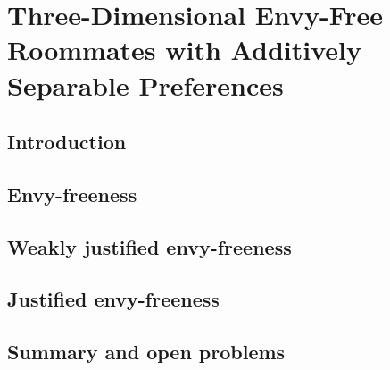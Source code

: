 \chapter{Three-Dimensional Envy-Free Roommates with Additively Separable Preferences}
\label{c:threed_efr_as}

\section{Introduction}
\label{sec:threed_efr_as_intro}


\section{Envy-freeness}
\label{sec:threed_efr_as_ef}


\section{Weakly justified envy-freeness}
\label{sec:threed_efr_as_wjef}


\section{Justified envy-freeness}
\label{sec:threed_efr_as_jef}


\section{Summary and open problems}
\label{sec:threed_efr_as_conclusion}
